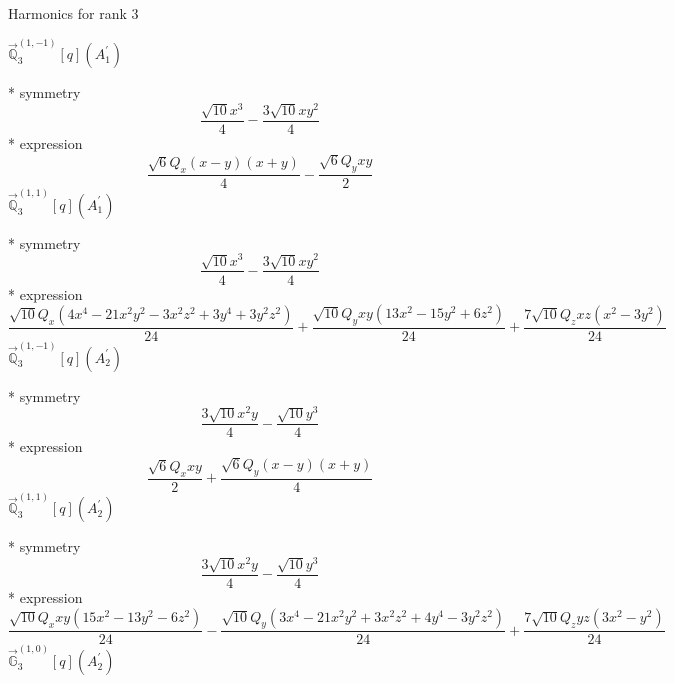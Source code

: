 \documentclass[fleqn,8pt]{jsarticle}
\begin{document}
\noindent * Harmonics for rank 3

\noindent\quad $\vec{\mathbb{Q}}_{3}^{(1,-1)}[q](A_{1}^{\prime})$

\noindent\quad ** symmetry
\begin{dmath*}
\frac{\sqrt{10} x^{3}}{4} - \frac{3 \sqrt{10} x y^{2}}{4}
\end{dmath*}
\noindent\quad ** expression
\begin{dmath*}
\frac{\sqrt{6} Q_{x} \left(x - y\right) \left(x + y\right)}{4} - \frac{\sqrt{6} Q_{y} x y}{2}
\end{dmath*}
\noindent\quad $\vec{\mathbb{Q}}_{3}^{(1,1)}[q](A_{1}^{\prime})$

\noindent\quad ** symmetry
\begin{dmath*}
\frac{\sqrt{10} x^{3}}{4} - \frac{3 \sqrt{10} x y^{2}}{4}
\end{dmath*}
\noindent\quad ** expression
\begin{dmath*}
\frac{\sqrt{10} Q_{x} \left(4 x^{4} - 21 x^{2} y^{2} - 3 x^{2} z^{2} + 3 y^{4} + 3 y^{2} z^{2}\right)}{24} + \frac{\sqrt{10} Q_{y} x y \left(13 x^{2} - 15 y^{2} + 6 z^{2}\right)}{24} + \frac{7 \sqrt{10} Q_{z} x z \left(x^{2} - 3 y^{2}\right)}{24}
\end{dmath*}
\noindent\quad $\vec{\mathbb{Q}}_{3}^{(1,-1)}[q](A_{2}^{\prime})$

\noindent\quad ** symmetry
\begin{dmath*}
\frac{3 \sqrt{10} x^{2} y}{4} - \frac{\sqrt{10} y^{3}}{4}
\end{dmath*}
\noindent\quad ** expression
\begin{dmath*}
\frac{\sqrt{6} Q_{x} x y}{2} + \frac{\sqrt{6} Q_{y} \left(x - y\right) \left(x + y\right)}{4}
\end{dmath*}
\noindent\quad $\vec{\mathbb{Q}}_{3}^{(1,1)}[q](A_{2}^{\prime})$

\noindent\quad ** symmetry
\begin{dmath*}
\frac{3 \sqrt{10} x^{2} y}{4} - \frac{\sqrt{10} y^{3}}{4}
\end{dmath*}
\noindent\quad ** expression
\begin{dmath*}
\frac{\sqrt{10} Q_{x} x y \left(15 x^{2} - 13 y^{2} - 6 z^{2}\right)}{24} - \frac{\sqrt{10} Q_{y} \left(3 x^{4} - 21 x^{2} y^{2} + 3 x^{2} z^{2} + 4 y^{4} - 3 y^{2} z^{2}\right)}{24} + \frac{7 \sqrt{10} Q_{z} y z \left(3 x^{2} - y^{2}\right)}{24}
\end{dmath*}
\noindent\quad $\vec{\mathbb{G}}_{3}^{(1,0)}[q](A_{2}^{\prime})$
\end{document}
